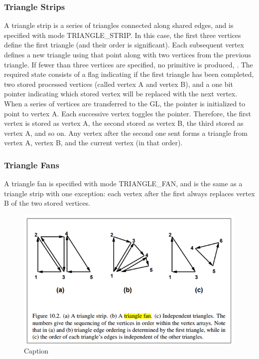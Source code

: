\subsubsection{Triangle Strips}
A triangle strip is a series of triangles connected along shared edges, and is specified with mode TRIANGLE\_STRIP. In this case, the first three vertices define the first triangle (and their order is significant). Each subsequent vertex defines a new triangle using that point along with two vertices from the previous triangle. If fewer than three vertices are specified, no primitive is produced, . The required state consists of a flag indicating if the first triangle has been completed, two stored processed vertices (called vertex A and vertex B), and a one bit pointer indicating which stored vertex will be replaced with the next vertex. When a series of vertices are transferred to the GL, the pointer is initialized to point to vertex A. Each successive vertex toggles the pointer. Therefore, the first vertex is stored as vertex A, the second stored as vertex B, the third stored as vertex A, and so on. Any vertex after the second one sent forms a triangle from vertex A, vertex B, and the current vertex (in that order).
\subsubsection{Triangle Fans}
A triangle fan is specified with mode TRIANGLE\_FAN, and is the same as a triangle strip with one exception: each vertex after the first always replaces vertex B of the two stored vertices.

\begin{figure}[ht]
    \centering
    \includegraphics{lit_review/images/TriangleRepresentationOpenGLDiagram.png}
    \caption{Caption}
    \label{fig:TriangleRepresentationOpenGL}
\end{figure}

